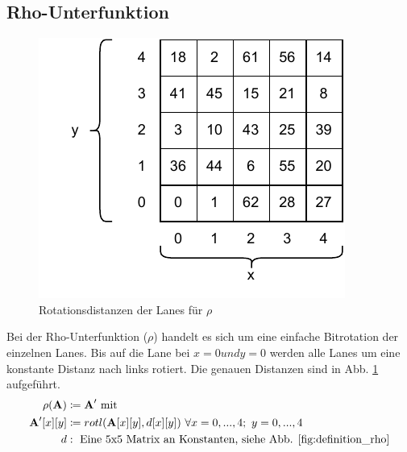 \subsection{Rho-Unterfunktion}
\begin{figure}
    \center
    \includegraphics{images/rho.pdf}
    \caption{Rotationsdistanzen der Lanes für $\rho$}
    \label{fig:definition_rho}
\end{figure}
Bei der Rho-Unterfunktion ($\rho$) handelt es sich um eine einfache Bitrotation der einzelnen Lanes.
Bis auf die Lane bei $x=0 und y=0$ werden alle Lanes um eine konstante Distanz nach links rotiert.
Die genauen Distanzen sind in Abb. \ref{fig:definition_rho} aufgeführt.
\begin{align*}
    \rho (\textbf{A}) & \coloneq \textbf{A}^\prime \text{ mit } \\
    \textbf{A}^\prime[x][y] & \coloneq rotl(\textbf{A}[x][y], d[x][y])\ \forall x = 0,...,4;\ y = 0,...,4 \\
    d & :\text{ Eine 5x5 Matrix an Konstanten, siehe Abb. \ref{fig:definition_rho}}
\end{align*}

